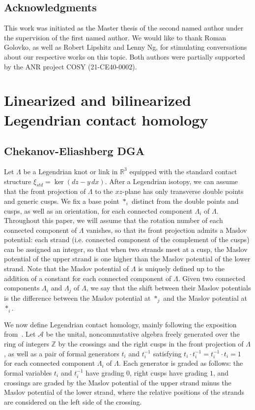\documentclass[11pt]{amsart}
\theoremstyle{plain}
\theoremstyle{remark}
\numberwithin{equation}{section}
\newcommand{\R}{\ensuremath{\mathbb{R}}}
\newcommand{\Z}{\ensuremath{\mathbb{Z}}}
\begin{document}
\subsection{Acknowledgments} This work was initiated as the Master thesis of the second named author under the supervision of the first named author.
We would like to thank Roman Golovko, as well as Robert Lipshitz and Lenny Ng, for
stimulating conversations about our respective works on this topic. 
Both authors were partially supported by the ANR project COSY (21-CE40-0002).



\section{Linearized and bilinearized Legendrian contact homology}
\label{sec:lbLCH}

\subsection{Chekanov-Eliashberg DGA}
\label{sec:CE-DGA}

Let $\Lambda$ be a Legendrian knot or link in $\R^3$ equipped with the standard contact structure $\xi_{std} = \ker(dz-y \, dx)$.
After a Legendrian isotopy, we can assume that the front projection of $\Lambda$ to the $xz$-plane has only transverse double points
and generic cusps. We fix a base point $*_i$ distinct from the double points and cusps, as well as an orientation, for each connected 
component $\Lambda_i$ 
of $\Lambda$. Throughout this paper, we will assume that the rotation number of each connected component of $\Lambda$ vanishes, 
so that its front projection admits a Maslov potential: each strand (i.e. connected component of the complement of the cusps) can be 
assigned an integer, so that when two strands meet at a cusp, the Maslov potential of the upper strand is one higher than the Maslov 
potential of the lower strand. Note that the Maslov potential of $\Lambda$ is uniquely defined up to the addition of a constant for each
connected component of $\Lambda$. Given two connected components $\Lambda_i$ and $\Lambda_j$ of $\Lambda$, we say that the
shift between their Maslov potentials is the difference between the Maslov potential at $*_j$ and the Maslov potential at $*_i$.

We now define Legendrian contact homology, mainly following the exposition from~\cite{N}.
Let $\mathcal{A}$ be the unital, noncommutative algebra freely generated over the ring of integers $\Z$ by the crossings and the right 
cusps in the front projection of $\Lambda$, as well as a pair of formal generators $t_i$ and $t_i^{-1}$ satisfying $t_i \cdot t_i^{-1} = t_i^{-1} \cdot t_i = 1$
for each connected component $\Lambda_i$ of $\Lambda$. Each generator is graded as follows: the formal variables $t_i$ and $t_i^{-1}$ have 
grading $0$, right cusps have grading $1$, and crossings are graded by the Maslov potential of the upper strand minus the Maslov potential 
of the lower strand, where the relative positions of the strands are considered on the left side of the crossing.
\end{document}
